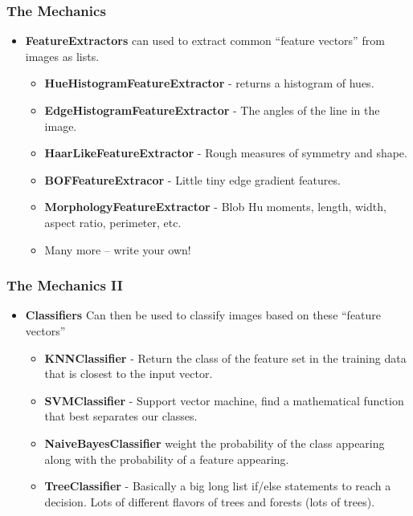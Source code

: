 \documentclass[compress]{beamer}
\begin{document}
\begin{frame}
  \frametitle{The Mechanics}
  \begin{itemize} 
  \item \textbf{FeatureExtractors} can used to extract common ``feature vectors'' from images
    as lists. 
    \begin{itemize}
    \item \textbf{HueHistogramFeatureExtractor} - returns a histogram
      of hues.
    \item \textbf{EdgeHistogramFeatureExtractor} - The angles of the
      line in the image.
    \item \textbf{HaarLikeFeatureExtractor} - Rough measures of
      symmetry and shape.
    \item \textbf{BOFFeatureExtracor} - Little tiny edge gradient
      features.
    \item \textbf{MorphologyFeatureExtractor} - Blob Hu moments,
      length, width, aspect ratio, perimeter, etc. 
    \item Many more -- write your own!
    \end{itemize} 
\end{itemize}
\end{frame}
\begin{frame}
  \frametitle{The Mechanics II}
  \begin{itemize} 
  \item \textbf{Classifiers} Can then be used to classify images based
    on these ``feature vectors''
    \begin{itemize} 
    \item \textbf{KNNClassifier} - Return the class of the feature set
      in the training data that is closest to the input vector.
    \item \textbf{SVMClassifier} - Support vector machine, find a
      mathematical function that best separates our classes. 
      \item \textbf{NaiveBayesClassifier} weight the probability of
        the class appearing along with the probability of a feature
        appearing.
      \item \textbf{TreeClassifier} - Basically a big long list if/else
        statements to reach a decision. Lots of different flavors of
        trees and forests (lots of trees).
      \end{itemize}
    \end{itemize}
  \end{frame}
\end{document}
